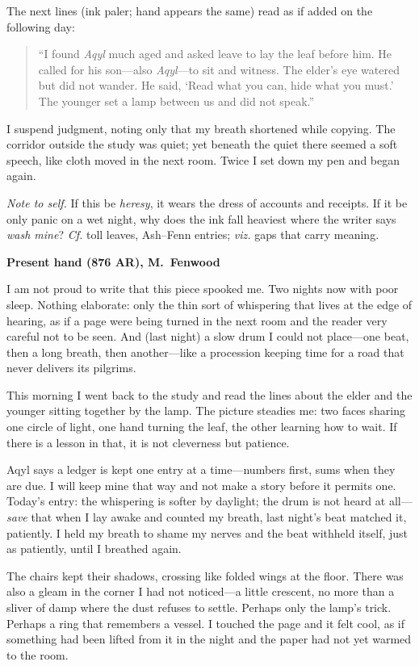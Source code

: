 \documentclass[11pt]{article}
\begin{document}
The next lines (ink paler; hand appears the same) read as if added on the following day:

\begin{quote}\small
“I found \textit{Aqyl} much aged and asked leave to lay the leaf before him. He called for his son—also \textit{Aqyl}—to sit and witness. The elder’s eye watered but did not wander. He said, ‘Read what you can, hide what you must.’ The younger set a lamp between us and did not speak.”
\end{quote}

I suspend judgment, noting only that my breath shortened while copying. The corridor outside the study was quiet; yet beneath the quiet there seemed a soft speech, like cloth moved in the next room. Twice I set down my pen and began again.

\medskip
\noindent\textit{Note to self.} If this be \emph{heresy}, it wears the dress of accounts and receipts. If it be only panic on a wet night, why does the ink fall heaviest where the writer says \emph{wash mine}? \emph{Cf.} toll leaves, Ash–Fenn entries; \emph{viz.} gaps that carry meaning.

\medskip
\noindent\textbf{Present hand (876 AR), M.\ Fenwood}

I am not proud to write that this piece spooked me. Two nights now with poor sleep. Nothing elaborate: only the thin sort of whispering that lives at the edge of hearing, as if a page were being turned in the next room and the reader very careful not to be seen. And (last night) a slow drum I could not place—one beat, then a long breath, then another—like a procession keeping time for a road that never delivers its pilgrims.

This morning I went back to the study and read the lines about the elder and the younger sitting together by the lamp. The picture steadies me: two faces sharing one circle of light, one hand turning the leaf, the other learning how to wait. If there is a lesson in that, it is not cleverness but patience.

Aqyl says a ledger is kept one entry at a time—numbers first, sums when they are due. I will keep mine that way and not make a story before it permits one. Today’s entry: the whispering is softer by daylight; the drum is not heard at all—\emph{save} that when I lay awake and counted my breath, last night’s beat matched it, patiently. I held my breath to shame my nerves and the beat withheld itself, just as patiently, until I breathed again.

The chairs kept their shadows, crossing like folded wings at the floor. There was also a gleam in the corner I had not noticed—a little crescent, no more than a sliver of damp where the dust refuses to settle. Perhaps only the lamp’s trick. Perhaps a ring that remembers a vessel. I touched the page and it felt cool, as if something had been lifted from it in the night and the paper had not yet warmed to the room.
\end{document}
